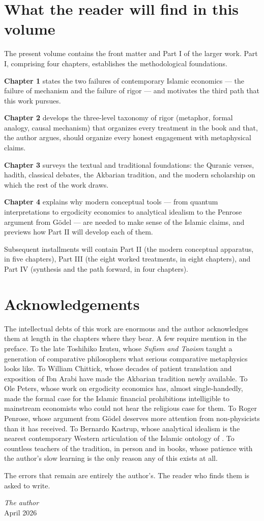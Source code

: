 \section*{What the reader will find in this volume}

The present volume contains the front matter and Part I of the larger
work. Part I, comprising four chapters, establishes the methodological
foundations.

\textbf{Chapter 1} states the two failures of contemporary Islamic
economics --- the failure of mechanism and the failure of rigor ---
and motivates the third path that this work pursues.

\textbf{Chapter 2} develops the three-level taxonomy of rigor (metaphor,
formal analogy, causal mechanism) that organizes every treatment in
the book and that, the author argues, should organize every honest
engagement with metaphysical claims.

\textbf{Chapter 3} surveys the textual and traditional foundations:
the Quranic verses, hadith, classical  debates, the
Akbarian tradition, and the modern scholarship on which the rest of
the work draws.

\textbf{Chapter 4} explains why modern conceptual tools --- from
quantum interpretations to ergodicity economics to analytical
idealism to the Penrose argument from G\"odel --- are needed to make
sense of the Islamic claims, and previews how Part II will develop
each of them.

Subsequent installments will contain Part II (the modern conceptual
apparatus, in five chapters), Part III (the eight worked treatments,
in eight chapters), and Part IV (synthesis and the path forward, in
four chapters).

\section*{Acknowledgements}

The intellectual debts of this work are enormous and the author
acknowledges them at length in the chapters where they bear. A few
require mention in the preface. To the late Toshihiko Izutsu, whose
\textit{Sufism and Taoism} taught a generation of comparative
philosophers what serious comparative metaphysics looks like. To
William Chittick, whose decades of patient translation and exposition
of Ibn Arabi have made the Akbarian tradition newly available. To
Ole Peters, whose work on ergodicity economics has, almost
single-handedly, made the formal case for the Islamic financial
prohibitions intelligible to mainstream economists who could not
hear the religious case for them. To Roger Penrose, whose argument
from G\"odel deserves more attention from non-physicists than it has
received. To Bernardo Kastrup, whose analytical idealism is the
nearest contemporary Western articulation of the Islamic ontology of
. To countless teachers of the tradition, in person and
in books, whose patience with the author's slow learning is the only
reason any of this exists at all.

The errors that remain are entirely the author's. The reader who
finds them is asked to write.

\vspace{1em}
\hfill\textit{The author}\\
\hfill April 2026

\cleardoublepage
